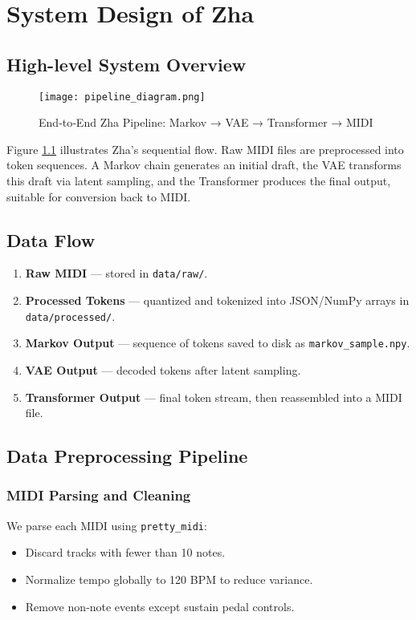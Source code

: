 \chapter{System Design of Zha}
\section{High-level System Overview}
\begin{figure}[ht]
  \centering
  \texttt{[image: pipeline\_diagram.png]}
  \caption{End‐to‐End Zha Pipeline: Markov → VAE → Transformer → MIDI}
  \label{fig:pipeline}
\end{figure}
Figure \ref{fig:pipeline} illustrates Zha’s sequential flow. Raw MIDI files are preprocessed into token sequences. A Markov chain generates an initial draft, the VAE transforms this draft via latent sampling, and the Transformer produces the final output, suitable for conversion back to MIDI.

\section{Data Flow}
\begin{enumerate}
  \item \textbf{Raw MIDI} — stored in \texttt{data/raw/}.
  \item \textbf{Processed Tokens} — quantized and tokenized into JSON/NumPy arrays in \texttt{data/processed/}.
  \item \textbf{Markov Output} — sequence of tokens saved to disk as \texttt{markov\_sample.npy}.
  \item \textbf{VAE Output} — decoded tokens after latent sampling.
  \item \textbf{Transformer Output} — final token stream, then reassembled into a MIDI file.
\end{enumerate}

\section{Data Preprocessing Pipeline}

\subsection{MIDI Parsing and Cleaning}
We parse each MIDI using \texttt{pretty\_midi}:
\begin{itemize}
  \item Discard tracks with fewer than 10 notes.
  \item Normalize tempo globally to 120 BPM to reduce variance.
  \item Remove non‐note events except sustain pedal controls.
\end{itemize}


